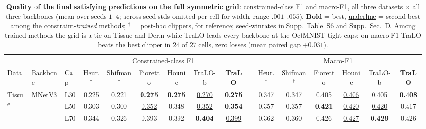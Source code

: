 \begin{table}[t]\centering\small
\setlength{\tabcolsep}{2.2pt}
\caption{\textbf{Quality of the final satisfying predictions on the full
symmetric grid}: constrained-class F1 and macro-F1, all three datasets $\times$
all three backbones (mean over seeds $1$--$4$; across-seed stds omitted per
cell for width, range $.001$--$.055$). \textbf{Bold} = best,
\underline{underline} = second-best among the constraint-\emph{trained}
methods; $^{\dagger}$ = post-hoc clippers, for reference; seed-winrates in
Supp.~Table~S6 and Supp.~Sec.~D. Among trained methods the grid is a tie on
Tissue and Derm while TraLO leads every backbone at the OctMNIST tight caps;
on macro-F1 TraLO beats the best clipper in $24$ of $27$ cells, zero losses
(mean paired gap $+0.031$).}
\label{tab:ccf1}
\vspace{4pt}
\begin{tabular}{lll cccccc |c cccccc}
\toprule
 & & & \multicolumn{6}{c}{Constrained-class F1} & & \multicolumn{6}{c}{Macro-F1} \\
\cmidrule(lr){4-9}\cmidrule(lr){11-16}
Data & Backbone & Cap & Heur.$^{\dagger}$ & Shifman$^{\dagger}$ & Fioretto & Hounie & TraLO-b & \textbf{TraLO} & & Heur.$^{\dagger}$ & Shifman$^{\dagger}$ & Fioretto & Hounie & TraLO-b & \textbf{TraLO} \\
\midrule
\multirow{9}{*}{Tissue} & \multirow{3}{*}{MNetV3} & L30 & 0.225 & 0.221 & \textbf{0.275} & \textbf{0.275} & \underline{0.270} & \textbf{0.275} & & 0.347 & 0.347 & 0.405 & \underline{0.406} & 0.405 & \textbf{0.408} \\
 &  & L50 & 0.303 & 0.300 & \underline{0.352} & 0.348 & \underline{0.352} & \textbf{0.354} & & 0.357 & 0.357 & \textbf{0.421} & \underline{0.420} & \underline{0.420} & 0.417 \\
 &  & L70 & 0.344 & 0.326 & 0.393 & 0.392 & \textbf{0.404} & \underline{0.399} & & 0.362 & 0.360 & 0.426 & \underline{0.427} & \textbf{0.429} & 0.426 \\

\end{tabular}
\end{table}
